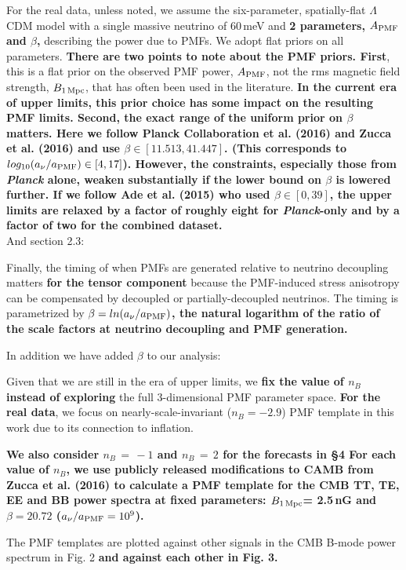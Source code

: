 \documentclass{article}
\newcommand{\apmf}{\ensuremath{A_{\rm PMF}}}
\newcommand{\bpmf}{\ensuremath{B_{\rm 1\,Mpc}}}
\newcommand{\lcdm}{\ensuremath{\Lambda}CDM}
\newcommand{\planck}{{\sl Planck}}
\newcommand{\added}[1]{\textbf{#1}}
\newcommand{\diff}[1]{\textcolor{PineGreen}{#1}}
\begin{document}
{\diff{For the real data, unless noted, we assume the six-parameter, spatially-flat \lcdm{} model with a single massive neutrino of 60\,meV and \added{2 parameters, \apmf{} and $\beta$, }describing the power due to PMFs.
We adopt flat priors on all parameters. 
\added{There are two points to note about the PMF priors. 
First}, this is a flat prior on the observed PMF power, $\apmf$, not the rms magnetic field strength, \bpmf, that has often been used in the literature. 
\added{In the current era of upper limits, this prior choice has some impact on the resulting PMF limits. 
Second, the exact range of the uniform prior on $\beta$ matters. 
Here we follow Planck Collaboration et al. (2016) and Zucca et al. (2016) and use $\beta \in [11.513, 41.447]$. (This corresponds to $log_{10} (a_{\nu}/a_{\rm{PMF}}) \in[4,17]$).
However, the constraints, especially those from \planck{} alone, weaken substantially if the lower bound on $\beta$ is lowered further. 
If we follow Ade et al. (2015) who used $\beta \in [0,39]$, the upper limits are relaxed by a factor of roughly eight for \planck-only and by a factor of two for the combined dataset.}}\\

And section 2.3:

\diff{Finally, the timing of when PMFs are generated relative to neutrino decoupling matters \added{for the tensor component} because the PMF-induced stress anisotropy can be compensated by decoupled or partially-decoupled neutrinos. 
The timing is parametrized by \added{$\beta = ln(a_{\nu}/a_{\rm{PMF}})$, the natural logarithm of the ratio of the scale factors at neutrino decoupling and PMF generation.}}

In addition we have added $\beta$ to our analysis:

\diff{Given that we are still in the era of upper limits, we \added{fix the value of $n_B$ instead of exploring} the full 3-dimensional PMF parameter space. 
\added{For the real data}, we focus on nearly-scale-invariant ($n_B = -2.9$) PMF template in this work due to its connection to inflation.}

\diff{\added{We also consider $n_B\,=\,-1$ and $n_B\,=\,2$ for the forecasts in \S 4 
For each value of $n_B$, we use publicly released modifications to CAMB from Zucca et al. (2016) to calculate a PMF template for the CMB TT, TE, EE and BB power spectra at fixed parameters: \bpmf = 2.5\,nG and $\beta=20.72$ ($a_{\nu}/a_{\rm{PMF}} = 10^9$).}}

\diff{The PMF templates are plotted against other signals in the CMB B-mode power spectrum in Fig. 2 \added{and against each other in Fig. 3. }}

}
\end{document}
